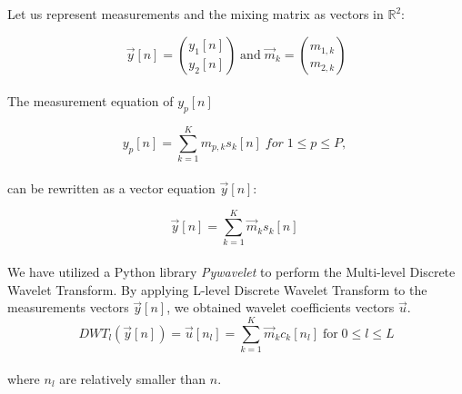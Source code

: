 \documentclass[a4paper,11pt]{article}
\begin{document}
Let us represent measurements and the mixing matrix as vectors in $ \mathbb{R}^{2} $:

\begin{equation}
    \vec{y}[n] = \binom{y_1[n]}{y_2[n]} \; \text{and} \; \vec{m}_k = \binom{m_{1,k}}{m_{2,k}}  
\end{equation}
\\
The measurement equation of $y_p[n]$ 

\[
    y_p[n] = \sum \limits _{{k=1 }}^{K}{m_{p,k}}{s_k[n]} \;for \; 1\leqslant{p}\leqslant{P}, \
\]
\\
can be rewritten as a vector equation $\vec{y}[n]$:

\begin{equation}
    \vec{y}[n] = \sum \limits _{{k=1 }}^{K}{\vec{m}_{k}}{s_k[n]} \;
\end{equation}
\\
We have utilized a Python library \textit{Pywavelet} to perform the Multi-level Discrete Wavelet Transform. By applying L-level Discrete Wavelet Transform to the measurements vectors $\vec{y}[n]$, we obtained wavelet coefficients vectors $\vec{u}$. 
\\
\begin{equation}
DWT_l(\vec{y}[n]) 
    = \vec{u}[n_l] 
    = \sum \limits _{{k=1 }}^{K}\vec{m}_{k}c_{k}[n_l] \; \text{for} \; 0\leq l\leq L
\end{equation}
\\
where $n_l$ are relatively smaller than $n$.

\pagebreak
\end{document}
